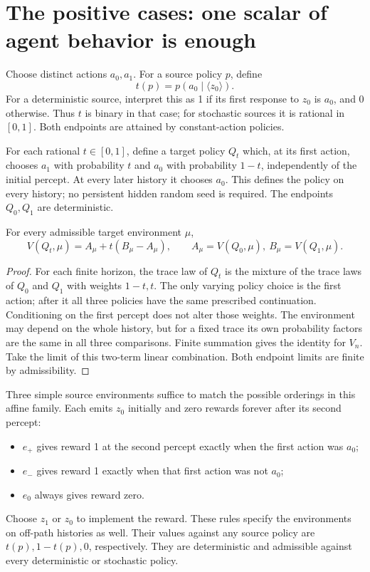 \documentclass[11pt]{article}
\begin{document}
\section{The positive cases: one scalar of agent behavior is enough}

Choose distinct actions $a_0,a_1$. For a source policy $p$, define
\[
 t(p)=p(a_0\mid\langle z_0\rangle).
\]
For a deterministic source, interpret this as 1 if its first response
to $z_0$ is $a_0$, and 0 otherwise. Thus $t$ is binary in that case;
for stochastic sources it is rational in $[0,1]$. Both endpoints are
attained by constant-action policies.

For each rational $t\in[0,1]$, define a target policy $Q_t$ which, at
its first action, chooses $a_1$ with probability $t$ and $a_0$ with
probability $1-t$, independently of the initial percept. At every later
history it chooses $a_0$. This defines the policy on every history;
no persistent hidden random seed is required. The endpoints $Q_0,Q_1$
are deterministic.

\begin{lemma}\label{lem:affine}
For every admissible target environment $\mu$,
\[
 V(Q_t,\mu)=A_\mu+t(B_\mu-A_\mu),
 \qquad A_\mu=V(Q_0,\mu),\ B_\mu=V(Q_1,\mu).
\]
\end{lemma}
\begin{proof}
For each finite horizon, the trace law of $Q_t$ is the mixture of the
trace laws of $Q_0$ and $Q_1$ with weights $1-t,t$. The only varying
policy choice is the first action; after it all three policies have
the same prescribed continuation. Conditioning on the first percept
does not alter those weights. The environment may depend on the whole
history, but for a fixed trace its own probability factors are the
same in all three comparisons. Finite summation gives the identity for
$V_n$. Take the limit of this two-term linear combination. Both
endpoint limits are finite by admissibility.
\end{proof}

Three simple source environments suffice to match the possible
orderings in this affine family. Each emits $z_0$ initially and zero
rewards forever after its second percept:
\begin{itemize}
\item $e_+$ gives reward 1 at the second percept exactly when the
      first action was $a_0$;
\item $e_-$ gives reward 1 exactly when that first action was not $a_0$;
\item $e_0$ always gives reward zero.
\end{itemize}
Choose $z_1$ or $z_0$ to implement the reward. These rules specify the
environments on off-path histories as well. Their values against any
source policy are $t(p),1-t(p),0$, respectively. They are deterministic
and admissible against every deterministic or stochastic policy.
\end{document}
